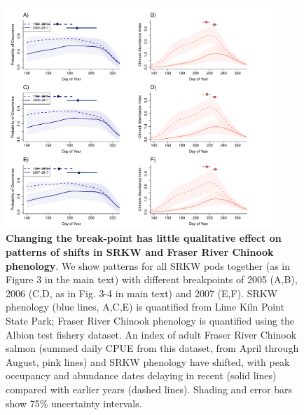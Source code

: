 \documentclass{article}
\begin{document}
\newpage
\begin{figure}[ht]
\includegraphics[width=0.9\textwidth]{../analyses/orcaphen/figures/orcachinphenoverlapbrmsSRallbrkyears.pdf}
\caption{\textbf{Changing the break-point has little qualitative effect on patterns of shifts in SRKW and Fraser River Chinook phenology}. We show patterns for all SRKW pods together (as in Figure 3 in the main text) with different breakpoints of 2005 (A,B), 2006 (C,D, as in Fig. 3-4 in main text) and 2007 (E,F). SRKW phenology (blue lines, A,C,E) is quantified from Lime Kiln Point State Park; Fraser River Chinook phenology is quantified using the Albion test fishery dataset. An index of adult Fraser River Chinook salmon (summed daily CPUE from this dataset, from April through August, pink lines) and SRKW phenology have shifted, with peak occupancy and abundance dates delaying in recent (solid lines) compared with earlier years (dashed lines). Shading and error bars show 75\% uncertainty intervals.}
\label{fig:brkpt}
\end{figure}
\end{document}
